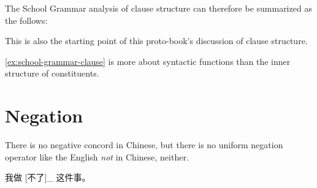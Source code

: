 \documentclass[../main.tex]{subfiles}
\begin{document}
The School Grammar analysis of clause structure can therefore be summarized as the follows:
\begin{exe}
    \ex\label{ex:school-grammar-clause} 
    
\end{exe}
This is also the starting point of this proto-book's discussion of clause structure. 

\eqref{ex:school-grammar-clause} is more about syntactic functions than the inner structure of constituents.

\section{Negation}

There is no negative concord in Chinese, but there is no uniform negation operator like the English 
\emph{not} in Chinese, neither. 

\begin{exe}
    \ex \begin{xlist}
        \ex 我做 [不了]_{} 这件事。
    \end{xlist}    
\end{exe}

\end{document}
